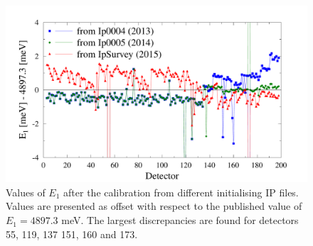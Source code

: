 \documentclass[11pt,a4paper,oneside]{article}
\begin{document}
\begin{figure}
\centering
\includegraphics[width=\textwidth]{img/E1}
\caption{Values of $E_1$ after the calibration from different initialising IP files. Values are presented as offset with respect to the published value of $E_1=4897.3$ meV. The largest discrepancies are found for detectors 55, 119, 137 151, 160 and 173.}
\label{t0}
\end{figure}
\end{document}
